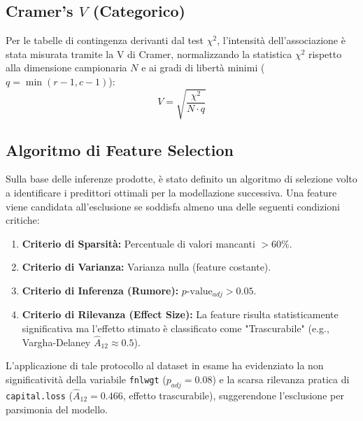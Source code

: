 \subsection{Cramer's $V$ (Categorico)}
Per le tabelle di contingenza derivanti dal test $\chi^2$, l'intensità dell'associazione è stata misurata tramite la V di Cramer, normalizzando la statistica $\chi^2$ rispetto alla dimensione campionaria $N$ e ai gradi di libertà minimi ($q = \min(r-1, c-1)$):
\begin{equation}
    V = \sqrt{\frac{\chi^2}{N \cdot q}}
\end{equation}

\subsection{Algoritmo di Feature Selection}

Sulla base delle inferenze prodotte, è stato definito un algoritmo di selezione volto a identificare i predittori ottimali per la modellazione successiva. Una feature viene candidata all'esclusione se soddisfa almeno una delle seguenti condizioni critiche:

\begin{enumerate}
    \item \textbf{Criterio di Sparsità:} Percentuale di valori mancanti $> 60\%$.
    \item \textbf{Criterio di Varianza:} Varianza nulla (feature costante).
    \item \textbf{Criterio di Inferenza (Rumore):} $p\text{-value}_{adj} > 0.05$.
    \item \textbf{Criterio di Rilevanza (Effect Size):} La feature risulta statisticamente significativa ma l'effetto stimato è classificato come "Trascurabile" (e.g., Vargha-Delaney $\hat{A}_{12} \approx 0.5$).
\end{enumerate}

\noindent
L'applicazione di tale protocollo al dataset in esame ha evidenziato la non significatività della variabile \texttt{fnlwgt} ($p_{adj}=0.08$) e la scarsa rilevanza pratica di \texttt{capital.loss} ($\hat{A}_{12}=0.466$, effetto trascurabile), suggerendone l'esclusione per parsimonia del modello.
